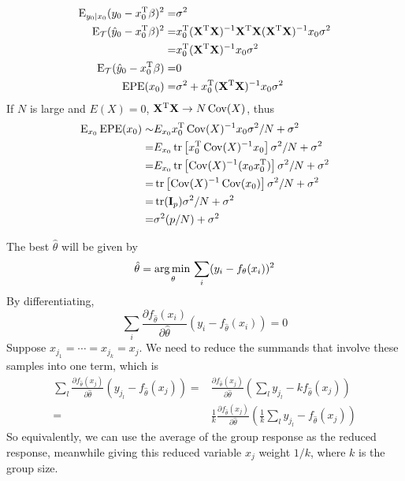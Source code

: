 \begin{sol}
\begin{align*}
\operatorname{E}_{y_0\vert x_0}(y_0-x_0^\mathrm{T}\beta)^2 =& \sigma^2 \\
\operatorname{E}_\mathcal{T} (\hat{y}_0-x_0^\mathrm{T}\beta)^2 =& x_0^\mathrm{T}(\mathbf{X}^\mathrm{T}\mathbf{X})^{-1}\mathbf{X}^\mathrm{T}\mathbf{X}(\mathbf{X}^\mathrm{T}\mathbf{X})^{-1}x_0\sigma^2 \\
=& x_0^\mathrm{T}(\mathbf{X}^\mathrm{T}\mathbf{X})^{-1}x_0\sigma^2 \\
\operatorname{E}_\mathcal{T} (\hat{y}_0-x_0^\mathrm{T}\beta) =& 0 \\
\mathrm{EPE}(x_0) =& \sigma^2 + x_0^\mathrm{T}(\mathbf{X}^\mathrm{T}\mathbf{X})^{-1}x_0\sigma^2
\end{align*}
If $N$ is large and $E(X)=0$, $\mathbf{X}^\mathrm{T}\mathbf{X}\to N\operatorname{Cov}(X)$, thus
\begin{align*}
\operatorname{E}_{x_0}\mathrm{EPE}(x_0) \sim & E_{x_0} x_0^\mathrm{T}\operatorname{Cov}(X)^{-1}x_0\sigma^2/N + \sigma^2 \\
=& E_{x_0} \operatorname{tr} \left[x_0^\mathrm{T}\operatorname{Cov}(X)^{-1}x_0\right]\sigma^2/N + \sigma^2 \\
=& E_{x_0} \operatorname{tr} \left[\operatorname{Cov}(X)^{-1}(x_0x_0^\mathrm{T})\right]\sigma^2/N + \sigma^2 \\
=& \operatorname{tr}\left[ \operatorname{Cov}(X)^{-1} \operatorname{Cov}(x_0)\right]\sigma^2/N + \sigma^2 \\
=& \operatorname{tr}(\mathbf{I}_p)\sigma^2/N + \sigma^2 \\
=& \sigma^2(p/N) + \sigma^2
\end{align*}
\end{sol}

\begin{sol}
The best $\hat{\theta}$ will be given by 
\[
\hat{\theta}=\operatorname*{arg\,min\,}_\theta \sum_i (y_i-f_\theta(x_i))^2
\]
By differentiating,
\[
\sum_i \frac{\partial f_{\hat{\theta}}(x_i)}{\partial \hat{\theta}} (y_i-f_{\hat{\theta}}(x_i)) =0
\]
Suppose $x_{j_1}=\cdots=x_{j_k}=x_j$. We need to reduce the summands that involve these samples into one term, which is
\begin{align*}
\sum_l \frac{\partial f_{\hat{\theta}}(x_j)}{\partial \hat{\theta}} (y_{j_l}-f_{\hat{\theta}}(x_j)) =& \frac{\partial f_{\hat{\theta}}(x_j)}{\partial \hat{\theta}}\left(\sum_l y_{j_l} - k f_{\hat{\theta}}(x_j)\right) \\
=& \frac{1}{k} \frac{\partial f_{\hat{\theta}}(x_j)}{\partial \hat{\theta}}\left(\frac{1}{k}\sum_l y_{j_l}-f_{\hat{\theta}}(x_j)\right)
\end{align*}
So equivalently, we can use the average of the group response as the reduced response, meanwhile giving this reduced variable $x_j$ weight $1/k$, where $k$ is the group size.
\end{sol}

